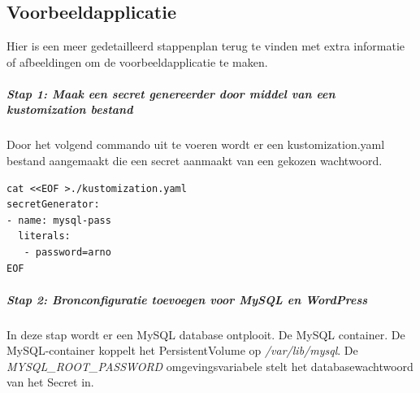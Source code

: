 
\chapter{}%
\label{ch:Bijlagen}

\section{Voorbeeldapplicatie}
Hier is een meer gedetailleerd stappenplan terug te vinden met extra informatie of afbeeldingen om de voorbeeldapplicatie te maken.

\paragraph{Stap 1: Maak een secret genereerder door middel van een kustomization bestand}
Door het volgend commando uit te voeren wordt er een kustomization.yaml bestand aangemaakt die een secret aanmaakt van een gekozen wachtwoord.
\begin{lstlisting}[language=tex, caption={Maak een secret genereerder door middel van een kustomization bestand}]
cat <<EOF >./kustomization.yaml
secretGenerator:
- name: mysql-pass
  literals:
   - password=arno
EOF
\end{lstlisting}

\paragraph{Stap 2: Bronconfiguratie toevoegen voor MySQL en WordPress}
In deze stap wordt er een MySQL database ontplooit. De MySQL container. De MySQL-container koppelt het PersistentVolume op \textit{/var/lib/mysql}. De \textit{MYSQL\_ROOT\_PASSWORD} omgevingsvariabele stelt het databasewachtwoord van het Secret in.

